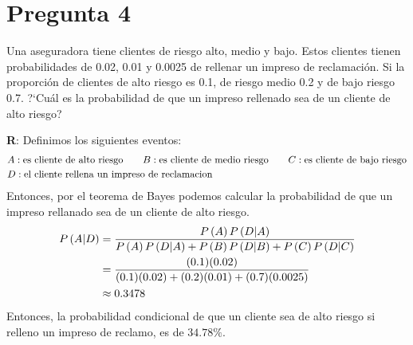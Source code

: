 
\section*{Pregunta 4}

Una aseguradora tiene clientes de riesgo alto, medio y bajo. Estos clientes tienen probabilidades de 0.02, 0.01 y 0.0025 de rellenar un impreso de reclamación. Si la proporción de clientes de alto riesgo es 0.1, de riesgo medio 0.2 y de bajo riesgo 0.7. ?`Cuál es la probabilidad de que un impreso rellenado sea de un cliente de alto riesgo?

\vspace{0.40cm}
\textbf{R}: Definimos los siguientes eventos:
\begin{align*}
& A: \text{es cliente de alto riesgo} \hspace{0.7cm} B: \text{es cliente de medio riesgo} \hspace{0.7cm} C: \text{es cliente de bajo riesgo} \\
& D: \text{el cliente rellena un impreso de reclamacion}
\end{align*}
Entonces, por el teorema de Bayes podemos calcular la probabilidad de que un impreso rellanado sea de un cliente de alto riesgo.
\begin{align*}
	{P} \left( {A | D} \right) & = \frac{{P} \left( {A} \right) {P} \left( {D | A} \right)}{{P} \left( {A} \right) {P} \left( {D | A} \right) 
	+ {P} \left( {B} \right) {P} \left( {D | B} \right) + {P} \left( {C} \right) {P} \left( {D | C} \right)} \\
	& = \frac{(0.1)(0.02)}{(0.1)(0.02) + (0.2)(0.01) + (0.7)(0.0025)}\\
	& \approx 0.3478 
\end{align*}
Entonces, la probabilidad condicional de que un cliente sea de alto riesgo si relleno un impreso de reclamo, es de $34.78\%$.
